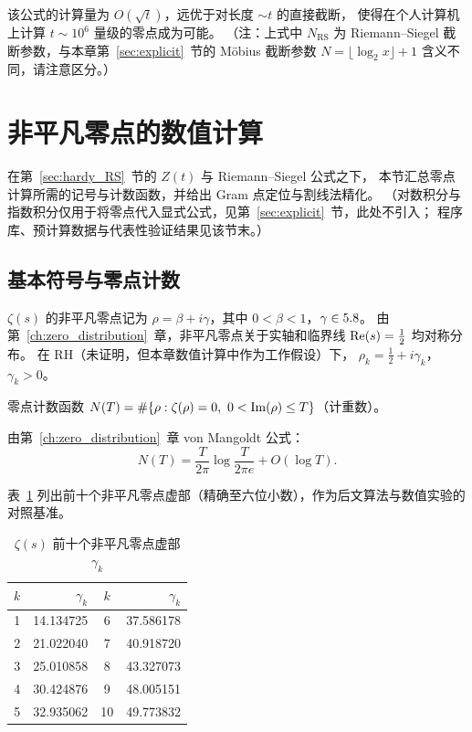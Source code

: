 该公式的计算量为 $O(\sqrt{t})$，远优于对长度 $\sim t$ 的直接截断，
使得在个人计算机上计算 $t\sim 10^6$ 量级的零点成为可能。
（注：上式中 $N_{\mathrm{RS}}$ 为 Riemann--Siegel 截断参数，与本章第~\ref{sec:explicit}~节的 Möbius 截断参数 $N=\lfloor \log_2 x \rfloor + 1$ 含义不同，请注意区分。）

\section{非平凡零点的数值计算}\label{sec:zeros}

在第~\ref{sec:hardy_RS}~节的 $Z(t)$ 与 Riemann--Siegel 公式之下，
本节汇总零点计算所需的记号与计数函数，并给出 Gram 点定位与割线法精化。
（对数积分与指数积分仅用于将零点代入显式公式，见第~\ref{sec:explicit}~节，此处不引入；
程序库、预计算数据与代表性验证结果见该节末。）

\subsection{基本符号与零点计数}\label{sec:prelim}

$\zeta(s)$ 的非平凡零点记为
$\rho = \beta + i\gamma$，其中 $0<\beta<1$，$\gamma\in5.8$。
由第~\ref{ch:zero_distribution}~章，非平凡零点关于实轴和临界线 $\operatorname{Re}(s)=\frac12$ 均对称分布。
在 RH（未证明，但本章数值计算中作为工作假设）下，
$\rho_k = \frac12 + i\gamma_k$，$\gamma_k > 0$。

\begin{definition}{零点计数函数}{}
$N(T) = \#\{\rho: \zeta(\rho)=0,\ 0<\operatorname{Im}(\rho)\le T\}$（计重数）。
\end{definition}

由第~\ref{ch:zero_distribution}~章 von Mangoldt 公式：
\begin{equation}
  N(T) = \frac{T}{2\pi}\log\frac{T}{2\pi e} + O(\log T).
  \label{eq:NT_chap15}
\end{equation}

表~\ref{tab:zeros} 列出前十个非平凡零点虚部（精确至六位小数），作为后文算法与数值实验的对照基准。

\begin{table}[htbp]
\centering
\caption{$\zeta(s)$ 前十个非平凡零点虚部 $\gamma_k$}
\label{tab:zeros}
\begin{tabular}{@{}crcr@{}}
\toprule
$k$ & $\gamma_k$ & $k$ & $\gamma_k$ \\
\midrule
1 & 14.134725 & 6 & 37.586178 \\
2 & 21.022040 & 7 & 40.918720 \\
3 & 25.010858 & 8 & 43.327073 \\
4 & 30.424876 & 9 & 48.005151 \\
5 & 32.935062 & 10 & 49.773832 \\
\bottomrule
\end{tabular}
\end{table}

